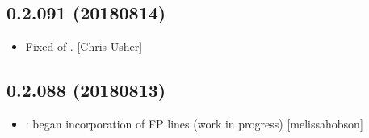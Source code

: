 \documentclass[a4paper,10pt,english]{report}
\begin{document}
\subsection{0.2.091 (2018\sphinxhyphen{}08\sphinxhyphen{}14)}
\label{\detokenize{misc/changelog:id392}}\begin{itemize}
\item {} 
Fixed  of . {[}Chris Usher{]}

\end{itemize}


\subsection{0.2.088 (2018\sphinxhyphen{}08\sphinxhyphen{}13)}
\label{\detokenize{misc/changelog:id393}}\begin{itemize}
\item {} 
: began incorporation of FP lines (work in
progress) {[}melissa\sphinxhyphen{}hobson{]}

\end{itemize}
\end{document}

